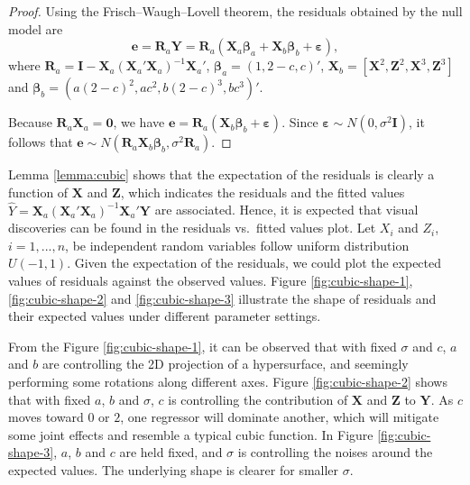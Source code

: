 \documentclass{monashthesis}
\theoremstyle{definition}
\theoremstyle{definition}
\theoremstyle{definition}
\theoremstyle{definition}
\theoremstyle{remark}
\begin{document}
\begin{proof}
Using the Frisch–Waugh–Lovell theorem, the residuals obtained by the null model are $$\boldsymbol{e}=\boldsymbol{R}_a\boldsymbol{Y}=\boldsymbol{R}_a(\boldsymbol{X}_a\boldsymbol{\beta}_a+\boldsymbol{X}_b\boldsymbol{\beta}_b+\boldsymbol{\varepsilon}),$$ where $\boldsymbol{R}_a=\boldsymbol{I}-\boldsymbol{X}_a(\boldsymbol{X}_a'\boldsymbol{X}_a)^{-1}\boldsymbol{X}_a'$, $\boldsymbol{\beta}_a=(1,2-c,c)'$, $\boldsymbol{X}_b=[\boldsymbol{X}^2,\boldsymbol{Z}^2,\boldsymbol{X}^3,\boldsymbol{Z}^3]$ and $\boldsymbol{\beta}_b=(a(2-c)^2,ac^2,b(2-c)^3,bc^3)'$. 

Because $\boldsymbol{R}_a\boldsymbol{X}_a=\boldsymbol{0}$, we have $\boldsymbol{e}=\boldsymbol{R}_a(\boldsymbol{X}_b\boldsymbol{\beta}_b+\boldsymbol{\varepsilon}).$ Since $\boldsymbol{\varepsilon} \sim N(0,\sigma^2\boldsymbol{I})$, it follows that $\boldsymbol{e} \sim N(\boldsymbol{R}_a\boldsymbol{X}_b\boldsymbol{\beta}_b, \sigma^2\boldsymbol{R}_a)$. 
\end{proof}

Lemma \ref{lemma:cubic} shows that the expectation of the residuals is clearly a function of \(\boldsymbol{X}\) and \(\boldsymbol{Z}\), which indicates the residuals and the fitted values \(\hat{Y} = \boldsymbol{X}_a(\boldsymbol{X}_a'\boldsymbol{X}_a)^{-1}\boldsymbol{X}_a'\boldsymbol{Y}\) are associated. Hence, it is expected that visual discoveries can be found in the residuals vs.~fitted values plot. Let \(X_i\) and \(Z_i\), \(i = 1,...,n\), be independent random variables follow uniform distribution \(U(-1,1)\). Given the expectation of the residuals, we could plot the expected values of residuals against the observed values. Figure \ref{fig:cubic-shape-1}, \ref{fig:cubic-shape-2} and \ref{fig:cubic-shape-3} illustrate the shape of residuals and their expected values under different parameter settings.

From the Figure \ref{fig:cubic-shape-1}, it can be observed that with fixed \(\sigma\) and \(c\), \(a\) and \(b\) are controlling the 2D projection of a hypersurface, and seemingly performing some rotations along different axes. Figure \ref{fig:cubic-shape-2} shows that with fixed \(a\), \(b\) and \(\sigma\), \(c\) is controlling the contribution of \(\boldsymbol{X}\) and \(\boldsymbol{Z}\) to \(\boldsymbol{Y}\). As \(c\) moves toward \(0\) or \(2\), one regressor will dominate another, which will mitigate some joint effects and resemble a typical cubic function. In Figure \ref{fig:cubic-shape-3}, \(a\), \(b\) and \(c\) are held fixed, and \(\sigma\) is controlling the noises around the expected values. The underlying shape is clearer for smaller \(\sigma\).
\end{document}
